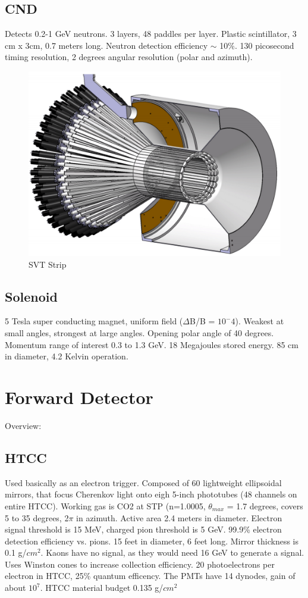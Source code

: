  
		\subsection{CND}
		    Detects 0.2-1 GeV neutrons. 3 layers, 48 paddles per layer. Plastic scintillator, 3 cm x 3cm, 0.7 meters  long. Neutron detection efficiency $\sim$ 10\%. 130 picosecond timing resolution, 2 degrees angular resolution (polar and azimuth).
            
            						
			 \begin{figure}[H]
    			\centering
    			\includegraphics[width=12cm]{CLAS-12/modules/clas-12-system/pics/cd/CND.PNG}
    			\caption{SVT Strip}
			\end{figure} 

		\subsection{Solenoid}
		    5 Tesla super conducting magnet, uniform field ($\Delta$B/B = $10^-4$). Weakest at small angles, strongest at large angles. Opening polar angle of 40 degrees. Momentum range of interest 0.3 to 1.3 GeV. 18 Megajoules stored energy. 85 cm in diameter, 4.2 Kelvin operation. 
		    
    \section{Forward Detector}
        Overview:
        \subsection{HTCC}
            Used basically as an electron trigger. Composed of 60 lightweight ellipsoidal mirrors, that focus Cherenkov light onto eigh 5-inch phototubes (48 channels on entire HTCC). Working gas is CO2 at STP (n=1.0005, $\theta_{max}$ = 1.7 degrees, covers 5 to 35 degrees, 2$\pi$ in azimuth. Active area 2.4 meters in diameter. Electron signal threshold is 15 MeV, charged pion threshold is 5 GeV. 99.9\% electron detection efficiency vs. pions. 15 feet in diameter, 6 feet long. Mirror thickness is 0.1 g/$cm^2$. Kaons have no signal, as they would need 16 GeV to generate a signal. Uses Winston cones to increase collection efficiency. 20 photoelectrons per electron in HTCC, 25\% quantum efficency. The PMTs have 14 dynodes, gain of about $10^7$. HTCC material budget 0.135 g/$cm^2$
            
